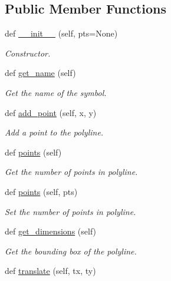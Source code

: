 \subsection*{Public Member Functions}
\begin{DoxyCompactItemize}
\item 
def \hyperlink{classbridges_1_1polyline_1_1_polyline_a536cf599bc221283c8e8d6df2324f23e}{\+\_\+\+\_\+init\+\_\+\+\_\+} (self, pts=None)
\begin{DoxyCompactList}\small\item\em Constructor. \end{DoxyCompactList}\item 
def \hyperlink{classbridges_1_1polyline_1_1_polyline_ac29d5a9cfe5fd60d97a32adef3a6b6bc}{get\+\_\+name} (self)
\begin{DoxyCompactList}\small\item\em Get the name of the symbol. \end{DoxyCompactList}\item 
def \hyperlink{classbridges_1_1polyline_1_1_polyline_a0afbd2327d8dcba63809a6be07704753}{add\+\_\+point} (self, x, y)
\begin{DoxyCompactList}\small\item\em Add a point to the polyline. \end{DoxyCompactList}\item 
def \hyperlink{classbridges_1_1polyline_1_1_polyline_ad1671a5857ad9e4010b7783b472c83fa}{points} (self)
\begin{DoxyCompactList}\small\item\em Get the number of points in polyline. \end{DoxyCompactList}\item 
def \hyperlink{classbridges_1_1polyline_1_1_polyline_ad543fcb38cb561b71d2ae2a9a88d9888}{points} (self, pts)
\begin{DoxyCompactList}\small\item\em Set the number of points in polyline. \end{DoxyCompactList}\item 
def \hyperlink{classbridges_1_1polyline_1_1_polyline_abc460c0169e1251e572642f8e968df05}{get\+\_\+dimensions} (self)
\begin{DoxyCompactList}\small\item\em Get the bounding box of the polyline. \end{DoxyCompactList}\item 
def \hyperlink{classbridges_1_1polyline_1_1_polyline_a654226c0de86aa0c6b9b5181a552cbfe}{translate} (self, tx, ty)

\end{DoxyCompactItemize}
